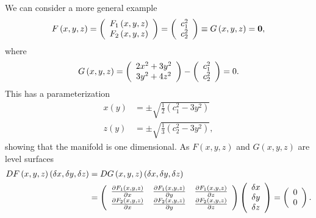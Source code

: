 \documentclass[aps,preprint]{revtex4}%
\begin{document}
We can consider a more general example
\begin{equation}
F\left(  x,y,z\right)  =\left(
\begin{array}
[c]{c}%
F_{1}\left(  x,y,z\right) \\
F_{2}\left(  x,y,z\right)
\end{array}
\right)  =\left(
\begin{array}
[c]{c}%
c_{1}^{2}\\
c_{2}^{2}%
\end{array}
\right)  \equiv G\left(  x,y,z\right)  =\mathbf{0},
\end{equation}
where
\begin{equation}
G\left(  x,y,z\right)  =\left(
\begin{array}
[c]{c}%
2x^{2}+3y^{2}\\
3y^{2}+4z^{2}%
\end{array}
\right)  -\left(
\begin{array}
[c]{c}%
c_{1}^{2}\\
c_{2}^{2}%
\end{array}
\right)  =0.
\end{equation}
This has a parameterization
\begin{align}
x\left(  y\right)   &  =\pm\sqrt{\frac{1}{2}\left(  c_{1}^{2}-3y^{2}\right)
}\nonumber\\
z\left(  y\right)   &  =\pm\sqrt{\frac{1}{3}\left(  c_{2}^{2}-3y^{2}\right)
},
\end{align}
showing that the manifold is one dimensional. As $F\left(  x,y,z\right)  $ and
$G\left(  x,y,z\right)  $ are level surfaces
\begin{align}
DF\left(  x,y,z\right)  \left(  \delta x,\delta y,\delta z\right)   &
=DG\left(  x,y,z\right)  \left(  \delta x,\delta y,\delta z\right) \nonumber\\
&  =\left(
\begin{array}
[c]{ccc}%
\frac{\partial F_{1}\left(  x,y,z\right)  }{\partial x} & \frac{\partial
F_{1}\left(  x,y,z\right)  }{\partial y} & \frac{\partial F_{1}\left(
x,y,z\right)  }{\partial z}\\
\frac{\partial F_{2}\left(  x,y,z\right)  }{\partial x} & \frac{\partial
F_{2}\left(  x,y,z\right)  }{\partial y} & \frac{\partial F_{2}\left(
x,y,z\right)  }{\partial z}%
\end{array}
\right)  \left(
\begin{array}
[c]{c}%
\delta x\\
\delta y\\
\delta z
\end{array}
\right)  =\left(
\begin{array}
[c]{c}%
0\\
0
\end{array}
\right)  .
\end{align}
\end{document}
